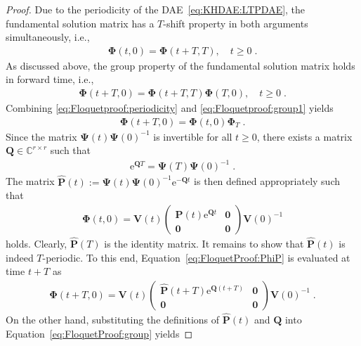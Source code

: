 \documentclass[10pt,a4paper]{amsart}
\newcommand{\Cspace}{\mathbb{C}}
\newcommand{\ex}{\re} %
\newcommand{\mo}{\vPh_T}
\newcommand{\re}{\mathrm e}
\newcommand{\vP}{\mathbf P}
\newcommand{\vPh}{\mathbf \Phi}
\newcommand{\vPs}{\mathbf \Psi}
\newcommand{\vQ}{\mathbf Q}
\newcommand{\vV}{\mathbf V}
\newcommand{\vzero}{\mathbf{0}}
\begin{document}
\begin{proof}
    Due to the periodicity of the DAE~\eqref{eq:KHDAE:LTPDAE}, the fundamental solution matrix has a $T$-shift property in both arguments simultaneously, i.e., 
    \begin{align}\label{eq:Floquetproof:periodicity}
        \vPh(t, 0) = \vPh(t+T, T), \quad t \geq 0 \;.
    \end{align}
    As discussed above, the group property of the fundamental solution matrix holds in forward time, i.e., 
    \begin{align}\label{eq:Floquetproof:group1}
        \vPh(t + T, 0) = \vPh(t + T, T) \vPh(T, 0), \quad t \geq 0 \;.
    \end{align}
    Combining \eqref{eq:Floquetproof:periodicity} and \eqref{eq:Floquetproof:group1} yields
    \begin{align}\label{eq:FloquetProof:group}
        \vPh(t + T, 0) =  \vPh(t, 0) \mo \;.
    \end{align} 
    Since the matrix $\vPs(t) \vPs(0)^{-1}$ is invertible for all $t \geq 0$, there exists a matrix $\vQ \in \Cspace^{r \times r}$ such that 
    \begin{align}\label{eq:FloquetProof:matrixlog}
        \ex^{\vQ T} = \vPs(T) \vPs(0)^{-1}\;.
    \end{align}
The matrix $\hat{\vP}(t) := \vPs(t) \vPs(0)^{-1} \ex^{-\vQ t}$ is then defined appropriately such that
    \begin{align}\label{eq:FloquetProof:PhiP}
        \vPh(t,0) = \vV(t) \begin{pmatrix}
            \hat{\vP}(t) \ex^{\vQ t} & \vzero\\ \vzero & \vzero
        \end{pmatrix} \vV(0)^{-1}
    \end{align}
    holds. Clearly, $\hat{\vP}(T)$ is the identity matrix. It remains to show that $\hat{\vP}(t)$ is indeed $T$-periodic. To this end, Equation~\eqref{eq:FloquetProof:PhiP} is evaluated at time $t+T$ as
    \begin{align}\label{eq:FloquetProof:PhitplusT}
        \vPh(t + T,0) = \vV(t) \begin{pmatrix}
            \hat{\vP}(t + T) \ex^{\vQ (t+T)}& \vzero\\ \vzero & \vzero
        \end{pmatrix} \vV(0)^{-1}\;.
    \end{align}
    On the other hand, substituting the definitions of $\hat{\vP}(t)$ and $\vQ$ into Equation~\eqref{eq:FloquetProof:group} yields

\end{proof}
\end{document}
